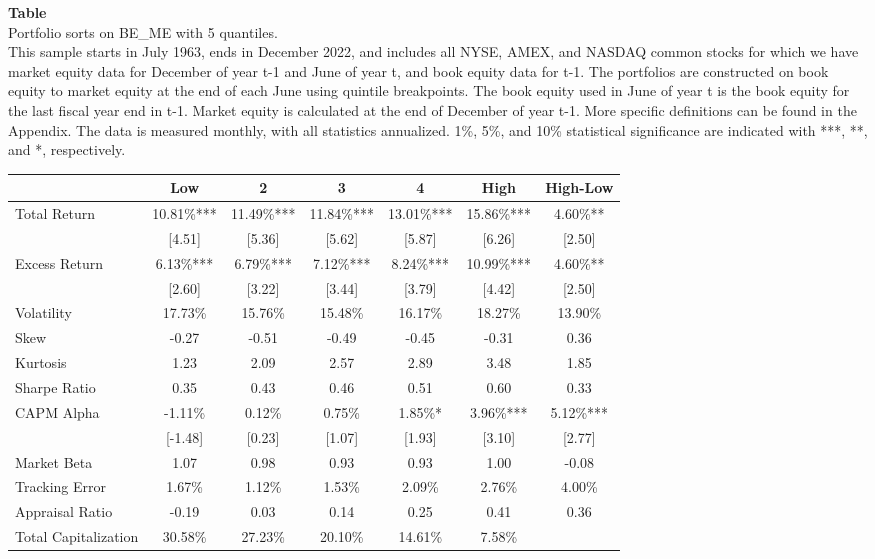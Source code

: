 \begin{table*}[ht!]
\raggedright
{}
\label{tab: summary_stats_BE_ME_with_5_quantiles}
\textbf{Table \thetable} \\
Portfolio sorts on BE\_ME with 5 quantiles. \\
\hspace*{1em}This sample starts in July 1963, ends in December 2022, and includes all NYSE, AMEX, and NASDAQ common stocks for which we have market equity data for December of year t-1 and June of year t, and book equity data for t-1. The portfolios are constructed on book equity to market equity at the end of each June using quintile breakpoints.  The book equity used in June of year t is the book equity for the last fiscal year end in t-1.  Market equity is calculated at the end of December of year t-1.  More specific definitions can be found in the Appendix.  The data is measured monthly, with all statistics annualized.  1\%, 5\%, and 10\% statistical significance are indicated with ***, **, and *, respectively. \\
\vspace{0.5em}
\centering
\begin{adjustbox}{max width=\textwidth}
\begin{tabular}{@{}lcccccc@{}}
\toprule
 & Low & 2 & 3 & 4 & High & High-Low \\
\midrule
Total Return & 10.81\%*** & 11.49\%*** & 11.84\%*** & 13.01\%*** & 15.86\%*** & 4.60\%** \\
 & [4.51] & [5.36] & [5.62] & [5.87] & [6.26] & [2.50] \\
Excess Return & 6.13\%*** & 6.79\%*** & 7.12\%*** & 8.24\%*** & 10.99\%*** & 4.60\%** \\
 & [2.60] & [3.22] & [3.44] & [3.79] & [4.42] & [2.50] \\
Volatility & 17.73\% & 15.76\% & 15.48\% & 16.17\% & 18.27\% & 13.90\% \\
Skew & -0.27 & -0.51 & -0.49 & -0.45 & -0.31 & 0.36 \\
Kurtosis & 1.23 & 2.09 & 2.57 & 2.89 & 3.48 & 1.85 \\
Sharpe Ratio & 0.35 & 0.43 & 0.46 & 0.51 & 0.60 & 0.33 \\
CAPM Alpha & -1.11\% & 0.12\% & 0.75\% & 1.85\%* & 3.96\%*** & 5.12\%*** \\
 & [-1.48] & [0.23] & [1.07] & [1.93] & [3.10] & [2.77] \\
Market Beta & 1.07 & 0.98 & 0.93 & 0.93 & 1.00 & -0.08 \\
Tracking Error & 1.67\% & 1.12\% & 1.53\% & 2.09\% & 2.76\% & 4.00\% \\
Appraisal Ratio & -0.19 & 0.03 & 0.14 & 0.25 & 0.41 & 0.36 \\
Total Capitalization & 30.58\% & 27.23\% & 20.10\% & 14.61\% & 7.58\% &  \\
\bottomrule
\end{tabular}
\end{adjustbox}
\end{table*}